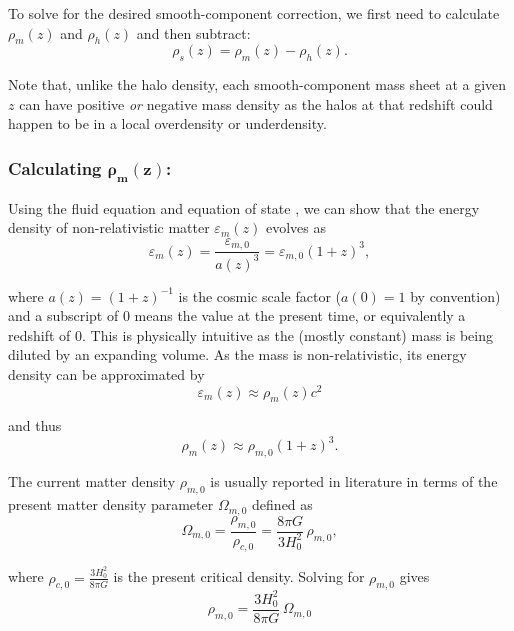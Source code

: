 \documentclass[%
 reprint,
 amsmath,amssymb,
 aps,nofootinbib
]{revtex4-1}
\begin{document}
To solve for the desired smooth-component correction, we first need to calculate ${\rho_m(z)}$ and ${\rho_h(z)}$ and then subtract:
\begin{equation}\label{smooth_correction2}
\rho_s(z)=\rho_m(z)-\rho_h(z).
\end{equation}

\noindent Note that, unlike the halo density, each smooth-component mass sheet at a given $z$ can have positive \textit{or} negative mass density as the halos at that redshift could happen to be in a local overdensity or underdensity.

\subsubsection{Calculating $\mathbf{\rho_m(z)}$:}

Using the fluid equation and equation of state \cite{modern_cosmology}, we can show that the energy density of non-relativistic matter $\varepsilon_m(z)$ evolves as
\begin{equation}\label{energy_evol}
\varepsilon_m(z)=\frac{\varepsilon_{m,0}}{a(z)^3}=\varepsilon_{m,0}(1+z)^3,
\end{equation}

\noindent where $a(z)=(1+z)^{-1}$ is the cosmic scale factor (${a(0)=1}$ by convention) and a subscript of 0 means the value at the present time, or equivalently a redshift of 0. This is physically intuitive as the (mostly constant) mass is being diluted by an expanding volume. As the mass is non-relativistic, its energy density can be approximated by
\begin{equation*}\label{energy_mass}
\varepsilon_m(z)\approx\rho_m(z)c^2
\end{equation*}

\noindent and thus
\begin{equation}\label{mass_evol}
\rho_m(z)\approx\rho_{m,0}(1+z)^3.
\end{equation}

The current matter density $\rho_{m,0}$ is usually reported in literature in terms of the present matter density parameter $\Omega_{m,0}$ defined as
\begin{equation}\label{}
\Omega_{m,0}=\frac{\rho_{m,0}}{\rho_{c,0}}=\frac{8\pi G}{3H_0^2}\,\rho_{m,0},
\end{equation}

\noindent where $\rho_{c,0}=\frac{3H_0^2}{8\pi G}$ is the present critical density. Solving for $\rho_{m,0}$ gives
\begin{equation*}\label{}
\rho_{m,0}=\frac{3H_0^2}{8\pi G}\,\Omega_{m,0}
\end{equation*}
\end{document}

